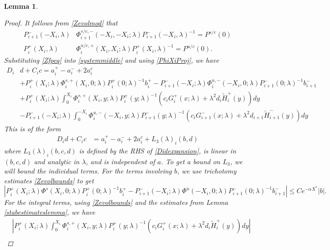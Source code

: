 \documentclass[10pt,reqno]{amsart}
\theoremstyle{plain}
\newtheorem{lemma}[theorem]{Lemma}
\theoremstyle{definition}
\theoremstyle{remark}
\numberwithin{theorem}{section}
\numberwithin{equation}{section}
\begin{document}
\begin{lemma}
\begin{proof}
It follows from \cref{Zevolmod} that
\begin{equation}\label{PhiXiProj}
\begin{aligned}
P_{i+1}^-(-X_i, \lambda) &\Phi_{i+1}^{s/c,-}(-X_i, -X_i; \lambda) P_{i+1}^-(-X_i, \lambda)^{-1} = P^{s/c}(0) \\
P_i^+(X_i, \lambda) &\Phi^{u/c,+}_{i}(X_i, X_i; \lambda) P_i^+(X_i, \lambda)^{-1} = P^{u/c}(0).
\end{aligned}
\end{equation}
Substituting \cref{Zfpeq} into \cref{systemmiddle} and using \cref{PhiXiProj}, we have
\begin{equation}\label{Didexpansion}
\begin{aligned}
D_i &d + C_i c = a_i^+ - a_i^- + 2 a_i^c \\
&+ P_i^+(X_i; \lambda)\Phi_i^{s,+}(X_i, 0; \lambda) P_i^+(0; \lambda)^{-1} b_i^+ - P_{i+1}^-(-X_i; \lambda)\Phi_i^{u,-}(-X_i, 0; \lambda) P_{i+1}^-(0; \lambda)^{-1} b_{i+1}^- \\
&+ P_i^+(X_i; \lambda) \int_0^{X_i} \Phi_i^{s,+}(X_i, y; \lambda)P_i^+(y; \lambda)^{-1} (c_i G_i^+(x; \lambda) + \lambda^2 d_i \tilde{H}_i^+(y)) dy \\ 
&- P_{i+1}^-(-X_i; \lambda) \int_0^{-X_i} \Phi_i^{u,-}(-X_i, y; \lambda) P_{i+1}^-(y; \lambda)^{-1}(c_i G_{i+1}^-(x; \lambda) + \lambda^2 d_{i+1} \tilde{H}_{i+1}^-(y)) dy
\end{aligned}
\end{equation}
This is of the form
\begin{align}\label{Dideq1}
D_i d + C_i c &= a_i^+ - a_i^- + 2 a_i^c + L_3(\lambda)_i(b, d)
\end{align}
where $L_3(\lambda)_i(b, c, d)$ is defined by the RHS of \cref{Didexpansion}, is linear in $(b,c,d)$ and analytic in $\lambda$, and is independent of $a$. To get a bound on $L_3$, we will bound the individual terms. For the terms involving $b$, we use trichotomy estimates \eqref{Zevolbounds} to get
\[
| P_i^+(X_i; \lambda)\Phi^s(X_i, 0; \lambda)P_i^+(0; \lambda)^{-1} b_i^+ - P_{i+1}^-(-X_i; \lambda) \Phi^u(-X_i, 0; \lambda) P_{i+1}^-(0; \lambda)^{-1} b_{i+1}^-| \leq C e^{-\alpha X^*} |b|.
\]
For the integral terms, using \eqref{Zevolbounds} and the estimates from Lemma \ref{stabestimateslemma}, we have
\begin{align*}
&\left| P_i^+(X_i; \lambda) \int_0^{X_i} \Phi_i^{s,+}(X_i, y; \lambda)P_i^+(y; \lambda)^{-1} (c_i G_i^+(x; \lambda) + \lambda^2 d_i \tilde{H}_i^+(y)) dy \right| \\

\end{align*}
\end{proof}
\end{lemma}
\end{document}
